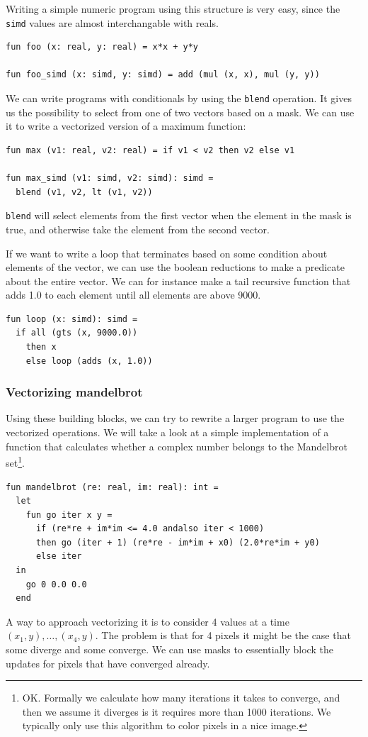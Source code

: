\documentclass{article}
\begin{document}
Writing a simple numeric program using this structure is very easy, since the \verb!simd! values are almost interchangable with reals.
\begin{lstlisting}[frame=single, label={lst:numeric}, caption={Numeric program}]
fun foo (x: real, y: real) = x*x + y*y

fun foo_simd (x: simd, y: simd) = add (mul (x, x), mul (y, y))
\end{lstlisting}
We can write programs with conditionals by using the \texttt{blend} operation. It gives us the possibility to select from one of two vectors based on a mask. We can use it to write a vectorized version of a maximum function:
\begin{lstlisting}[frame=single, label={lst:max}, caption={Max function}]
fun max (v1: real, v2: real) = if v1 < v2 then v2 else v1

fun max_simd (v1: simd, v2: simd): simd =
  blend (v1, v2, lt (v1, v2))
\end{lstlisting}
\texttt{blend} will select elements from the first vector when the element in the mask is true, and otherwise take the element from the second vector.

If we want to write a loop that terminates based on some condition about elements of the vector, we can use the boolean reductions to make a predicate about the entire vector.
We can for instance make a tail recursive function that adds 1.0 to each element until all elements are above 9000.
\begin{lstlisting}[frame=single, label={lst:max}, caption={Iteration with guard}]
fun loop (x: simd): simd =
  if all (gts (x, 9000.0))
    then x
    else loop (adds (x, 1.0))
\end{lstlisting}

\subsubsection{Vectorizing mandelbrot}

Using these building blocks, we can try to rewrite a larger program to use the vectorized operations. We will take a look at a simple implementation of a function that calculates whether a complex number belongs to the Mandelbrot set\footnote{OK. Formally we calculate how many iterations it takes to converge, and then we assume it diverges is it requires more than 1000 iterations. We typically only use this algorithm to color pixels in a nice image.}.
\begin{lstlisting}[frame=single, label={lst:scalar_mandel}, caption={Scalar Mandelbrot}]
fun mandelbrot (re: real, im: real): int =
  let
    fun go iter x y =
      if (re*re + im*im <= 4.0 andalso iter < 1000)
      then go (iter + 1) (re*re - im*im + x0) (2.0*re*im + y0)
      else iter
  in
    go 0 0.0 0.0
  end
\end{lstlisting}
A way to approach vectorizing it is to consider 4 values at a time $(x_1, y), \ldots, (x_4, y)$. The problem is that for 4 pixels it might be the case that some diverge and some converge. We can use masks to essentially block the updates for pixels that have converged already.
\end{document}
